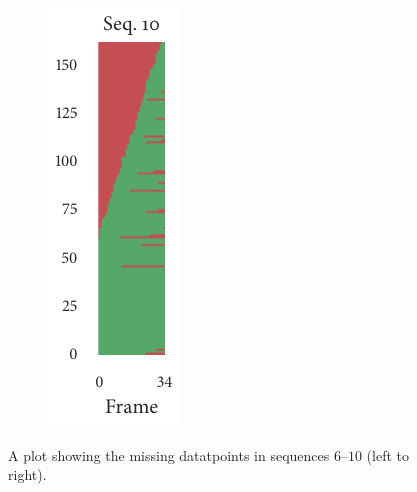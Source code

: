\begin{figure}[t]
\begin{subfigure}[b]{0.2\textwidth}
		\centering
		\includegraphics{missingness_sequence10.pdf}
	\end{subfigure}%
	\caption{A plot showing the missing datatpoints in sequences $6$--$10$ (left to right).}
\end{figure}

